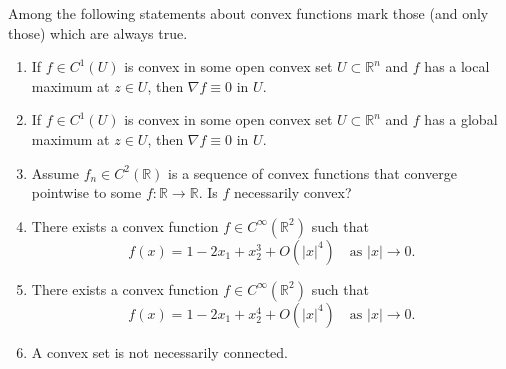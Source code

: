 

\begin{exercise}
\label{ex:convexity_properties_multiple_choice}
Among the following statements about convex functions mark those (and only those) which are
always true.
\begin{enumerate}[label=\textbf{(\alph*)}]
  \item If $f \in C^1(U)$ is convex in some open convex set $U \subset \mathbb{R}^n$ and $f$ has a
    local maximum at $z \in U$, then $\nabla f \equiv 0$ in $U$.
  \item If $f \in C^1(U)$ is convex in some open convex set $U \subset \mathbb{R}^n$ and $f$ has a
    global maximum at $z \in U$, then $\nabla f \equiv 0$ in $U$.
  \item Assume $f_n \in C^2(\mathbb{R})$ is a sequence of convex functions that converge
    pointwise to some $f : \mathbb{R} \to \mathbb{R}$. Is $f$ necessarily convex?
  \item There exists a convex function $f \in C^\infty(\mathbb{R}^2)$ such that
    \[f(x) = 1 - 2x_1 + x_2^3 + O(|x|^4) \quad \text{as } |x| \to 0.\]
  \item There exists a convex function $f \in C^\infty(\mathbb{R}^2)$ such that
    \[f(x) = 1 - 2x_1 + x_2^4 + O(|x|^4) \quad \text{as } |x| \to 0.\]
  \item A convex set is not necessarily connected.
\end{enumerate}
\end{exercise}
